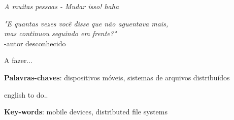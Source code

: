 \documentclass[
	12pt,				%
	openright,			%
	oneside,			%
	a4paper,			%
	english,			%
	brazil				%
	]{abntex2}
\begin{document}
\begin{dedicatoria}
   \vspace*{\fill}
   \centering
   \noindent
   \textit{ A muitas pessoas - Mudar isso! haha} \vspace*{\fill}
\end{dedicatoria}

\begin{comment}

\begin{agradecimentos}

Neste momento, gostaria de agradecer a Deus e todas as pessoas que têm tornado este trabalho possível até o presente momento...

\end{agradecimentos}

\end{comment}


\begin{epigrafe}
    \vspace*{\fill}
	\begin{flushright}
		\textit{"E quantas vezes você disse que não aguentava mais,\\ mas continuou seguindo em frente?"} \\
		-autor desconhecido
	\end{flushright}
\end{epigrafe}


\setlength{\absparsep}{18pt} %
\begin{resumo}
 A fazer...

 \textbf{Palavras-chaves}: dispositivos móveis, sistemas de arquivos distribuídos
\end{resumo}

\begin{resumo}[Abstract]
 \begin{otherlanguage*}{english}
   to do..

   \vspace{\onelineskip}
 
   \noindent 
   \textbf{Key-words}: mobile devices, distributed file systems
 \end{otherlanguage*}
\end{resumo}
\end{document}
